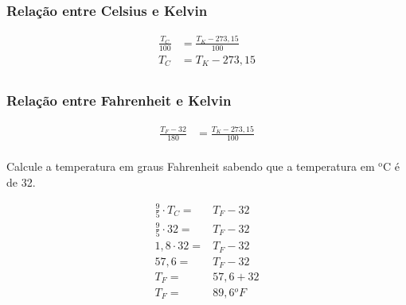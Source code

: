 \subsubsection{Relação entre Celsius e Kelvin}
\begin{ceqn}
    \begin{align*}
        \frac{T_C}{100} &= \frac{T_K-273,15}{100} \\
        T_C&=T_K-273,15 \\
    \end{align*}
\end{ceqn}

\subsubsection{Relação entre Fahrenheit e Kelvin}
\begin{ceqn}
    \begin{align*}
        \frac{T_F - 32}{180} &= \frac{T_K-273,15}{100} \\
    \end{align*}
\end{ceqn}



\begin{example}
Calcule a temperatura em graus Fahrenheit sabendo que a temperatura em ${}^\text{o}$C é de 32.

\begin{ceqn}
\begin{align*}
\frac{9}{5} \cdot T_C =& T_F - 32 \\
\frac{9}{5} \cdot 32 =& T_F - 32 \\
1,8 \cdot 32 =& T_F - 32 \\
57,6 =& T_F -32 \\
T_F =& 57,6 + 32 \\
T_F =& 89,6 {}^oF \\
\end{align*}
\end{ceqn}
\end{example}

